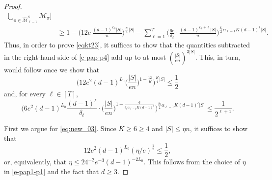 \documentclass[10pt,a4paper]{amsart}
\begin{document}
\begin{proof}
\begin{align}
\bigcup_{\pi\in \widehat{\mathcal{M}}^S_{\ell-1}} \mathcal{M}_{\pi} \bigg] \nonumber \\
& \geqslant 1 -\Big(12e\, \frac{(d-1)^{L_0}|S|}{n} \Big)^{\frac{K}{4} |S|}
- \sum_{\ell=1}^{T}  \Big(\frac{6e}{\delta_\ell} \cdot
\frac{(d-1)^{L_0+\ell}|S|}{n}\Big)^{\frac{\delta_\ell}{2} \alpha_{\ell-1}K (d-1)^{\ell} |S|}. \nonumber
\end{align}
Thus, in order to prove \eqref{eqkt23}, it suffices to show that the quantities subtracted  in the right-hand-side of \eqref{e-pap-p4}
add up to at most $\binom{|S|}{e n}^{3|S|}$. This, in turn, would follow once we show that
\begin{equation}\label{eq:new_03}
\bigg(12 e^2 (d-1)^{L_0} \Big(\frac{|S|}{en}\Big)^{1-\frac{12}{K}} \bigg)^{\frac{K}{4}|S|} \leqslant \frac{1}{2}
\end{equation}
and, for every $\ell\in[T]$,
\begin{equation} \label{e-pap-p5}
\bigg(6e^2(d-1)^{L_0}\frac{(d-1)^{\ell}}{\delta_\ell} \cdot
\Big(\frac{|S|}{en}\Big)^{1-\frac{6}{\delta_\ell\alpha_{\ell-1}K(d-1)^{\ell}}}
\bigg)^{\frac{\delta_\ell}{2} \alpha_{\ell-1}K (d-1)^{\ell} |S|}
\leqslant \frac{1}{2^{\ell+1}}.
\end{equation}

First we argue for \eqref{eq:new_03}. Since $K\geqslant 6\geqslant 4$ and $|S|\leqslant\eta n$, it suffices to show that
\[ 12 e^2 (d-1)^{L_0} (\eta/e)^{\frac{1}{2}}\leqslant\frac{1}{2}, \]
or, equivalently, that $\eta\leqslant 24^{-2}e^{-3}(d-1)^{-2L_0}$.
This follows from the choice of $\eta$ in \eqref{e-pap1-p1} and the fact that $d\geqslant 3$.


\end{proof}
\end{document}
